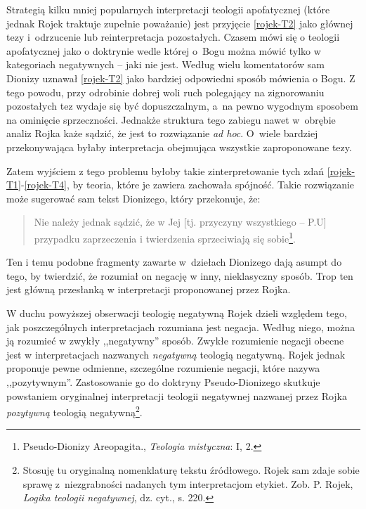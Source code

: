 Strategią kilku mniej popularnych interpretacji teologii apofatycznej
(które jednak Rojek traktuje zupełnie poważanie)
 jest przyjęcie \eqref{rojek-T2} jako głównej tezy i~odrzucenie lub reinterpretacja pozostałych.
Czasem
mówi się o teologii apofatycznej jako o doktrynie wedle
której o~Bogu można mówić tylko w kategoriach negatywnych -- jaki nie
jest. Według wielu komentatorów sam Dionizy uznawał \eqref{rojek-T2} jako bardziej odpowiedni sposób mówienia o Bogu.
Z tego powodu, przy odrobinie dobrej woli ruch polegający na zignorowaniu pozostałych tez wydaje się być
dopuszczalnym, a~na pewno wygodnym sposobem na ominięcie sprzeczności. Jednakże struktura tego zabiegu nawet w~obrębie analiz Rojka każe sądzić, że jest to rozwiązanie \textit{ad hoc}. O~wiele
bardziej przekonywająca byłaby interpretacja obejmująca wszystkie
zaproponowane tezy.

Zatem wyjściem z tego problemu byłoby takie zinterpretowanie tych zdań \eqref{rojek-T1}-\eqref{rojek-T4},
by teoria, które je zawiera zachowała spójność. Takie rozwiązanie może
sugerować sam tekst Dionizego, który przekonuje, że:

\begin{quote}
    Nie należy jednak sądzić, że w Jej [tj. przyczyny wszystkiego -- P.U]
przypadku zaprzeczenia i twierdzenia sprzeciwiają się
sobie\footnote{Pseudo-Dionizy Areopagita., \textit{Teologia mistyczna}:
 I, 2.}.
\end{quote}
Ten i temu podobne fragmenty zawarte w~dziełach Dionizego dają asumpt do tego, by twierdzić, że rozumiał on negację w inny, nieklasyczny sposób.
Trop ten jest główną przesłanką w interpretacji proponowanej przez
Rojka.



W duchu powyższej obserwacji teologię negatywną Rojek dzieli względem tego, jak
poszczególnych interpretacjach rozumiana jest negacja. Według niego,
można ją rozumieć w zwykły ,,negatywny'' sposób. Zwykłe rozumienie
negacji obecne jest w interpretacjach nazwanych \textit{negatywną}
teologią negatywną. Rojek jednak proponuje pewne odmienne, szczególne
rozumienie negacji, które nazywa ,,pozytywnym''. Zastosowanie go do
doktryny Pseudo-Dionizego skutkuje powstaniem oryginalnej interpretacji teologii negatywnej nazwanej przez Rojka
\textit{pozytywną} teologią negatywną\footnote{Stosuję tu oryginalną nomenklaturę
tekstu źródłowego. Rojek sam zdaje sobie sprawę z~niezgrabności nadanych
tym interpretacjom etykiet. Zob. P. Rojek, \textit{Logika teologii negatywnej}, dz. cyt., s. 220.}.







